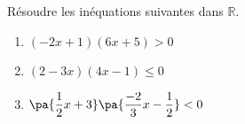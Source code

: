 \begin{exo}{}
	Résoudre les inéquations suivantes dans $\mathbb{R}$.
	\begin{enumerate}[itemsep=2mm]
		\item $(-2x + 1)(6x + 5) > 0$
		\item $(2 - 3x)(4x - 1) \leqslant 0$
		\item $\pa{\dfrac{1}{2}x + 3}\pa{\dfrac{-2}{3}x - \dfrac{1}{2}} < 0$
	\end{enumerate}
\end{exo}

